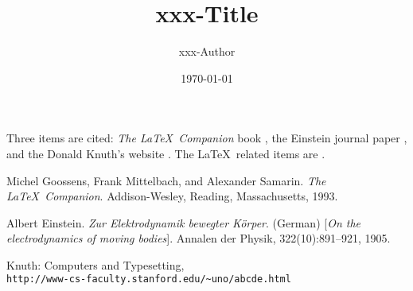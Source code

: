 \documentclass{article}
\title{xxx-Title}
\author{xxx-Author}
\date{\today}
\begin{document}
\maketitle

Three items are cited: \textit{The \LaTeX\ Companion}
book \cite{latexcompanion}, the Einstein journal paper \cite{einstein}, and the
Donald Knuth's website \cite{knuthwebsite}. The \LaTeX\ related items are
\cite{latexcompanion,knuthwebsite}.

\begin{thebibliography}{9}
Michel Goossens, Frank Mittelbach, and Alexander Samarin.
\textit{The \LaTeX\ Companion}.
Addison-Wesley, Reading, Massachusetts, 1993.

Albert Einstein.
\textit{Zur Elektrodynamik bewegter K{\"o}rper}. (German)
[\textit{On the electrodynamics of moving bodies}].
Annalen der Physik, 322(10):891–921, 1905.

Knuth: Computers and Typesetting,\\
\texttt{http://www-cs-faculty.stanford.edu/\~{}uno/abcde.html}
\end{thebibliography}
\end{document}
